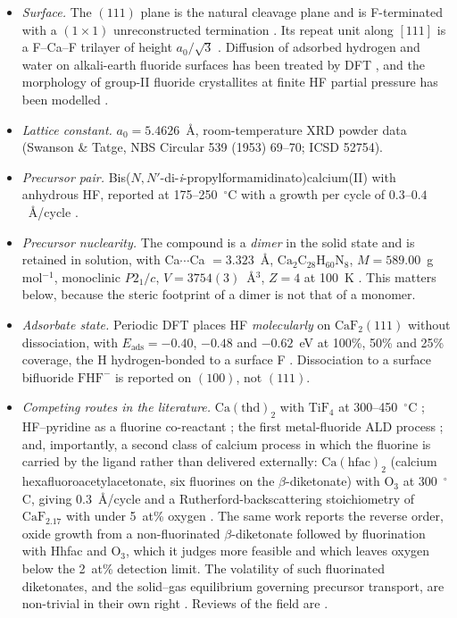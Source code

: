 \begin{itemize}
\item \emph{Surface.} The $(111)$ plane is the natural cleavage plane and is
F-terminated with a $(1\times1)$ unreconstructed termination
\citep{Vogt2005,Puchin2001}. Its repeat unit along $[111]$ is a
F--Ca--F trilayer of height $a_0/\sqrt3$ \citep{Calleja2005}. Diffusion of
adsorbed hydrogen and water on alkali-earth fluoride surfaces has been treated
by DFT \citep{Foster2009}, and the morphology of group-II fluoride crystallites
at finite HF partial pressure has been modelled \citep{Kaawar2017}.
\item \emph{Lattice constant.} $a_0 = 5.4626$~\AA, room-temperature XRD powder
data (Swanson \& Tatge, NBS Circular 539 (1953) 69--70; ICSD 52754).
\item \emph{Precursor pair.} Bis($N,N'$-di-\emph{i}-propylformamidinato)calcium(II)
with anhydrous HF, reported at 175--250~$^\circ$C with a growth per cycle of
$0.3$--$0.4$~\AA/cycle \citep{Hennessy2023}.
\item \emph{Precursor nuclearity.} The compound is a \emph{dimer} in the solid
state and is retained in solution, with Ca$\cdots$Ca $=3.323$~\AA, $\mathrm{Ca_2C_{28}H_{60}N_8}$,
$M=589.00$~g\,mol$^{-1}$, monoclinic $P2_1/c$, $V=3754(3)$~\AA$^3$, $Z=4$ at
100~K \citep{Kim2016}. This matters below, because the steric footprint of a
dimer is not that of a monomer.
\item \emph{Adsorbate state.} Periodic DFT places HF \emph{molecularly} on
$\mathrm{CaF_2}(111)$ without dissociation, with $E_{\mathrm{ads}}=-0.40$,
$-0.48$ and $-0.62$~eV at 100\%, 50\% and 25\% coverage, the H hydrogen-bonded
to a surface F \citep{Kaawar2019}. Dissociation to a surface bifluoride
$\mathrm{FHF^-}$ is reported on $(100)$, not $(111)$.
\item \emph{Competing routes in the literature.} $\mathrm{Ca(thd)_2}$ with
$\mathrm{TiF_4}$ at 300--450~$^\circ$C \citep{Pilvi2007,Pilvi2008}; HF--pyridine
as a fluorine co-reactant \citep{Lee2016}; the first metal-fluoride ALD
process \citep{Ylilammi1994}; and, importantly, a second class of calcium
process in which the fluorine is carried by the ligand rather than delivered
externally: $\mathrm{Ca(hfac)_2}$ (calcium hexafluoroacetylacetonate, six
fluorines on the $\beta$-diketonate) with $\mathrm{O_3}$ at 300~$^\circ$C,
giving $0.3$~\AA/cycle and a Rutherford-backscattering stoichiometry of
$\mathrm{CaF_{2.17}}$ with under 5~at\% oxygen \citep{Putkonen2011}. The same
work reports the reverse order, oxide growth from a non-fluorinated
$\beta$-diketonate followed by fluorination with Hhfac and $\mathrm{O_3}$,
which it judges more feasible and which leaves oxygen below the 2~at\%
detection limit. The volatility of such fluorinated diketonates, and the
solid--gas equilibrium governing precursor transport, are non-trivial in their
own right \citep{LoPresti2022}. Reviews of the field are
\citep{Atosuo2024,Hennessy2017}.
\end{itemize}

